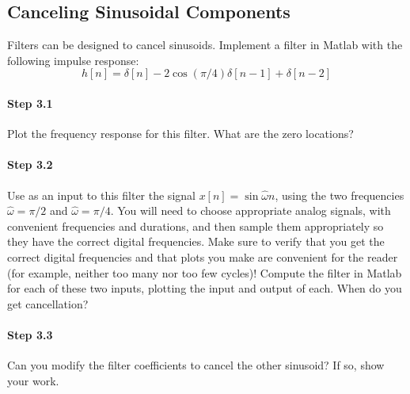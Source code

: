 \subsection{Canceling Sinusoidal Components}

Filters can be designed to cancel sinusoids.  Implement a filter in
Matlab with the following impulse response:
\begin{equation}
h[n] = \delta[n] - 2\cos(\pi/4) \delta[n-1] + \delta[n-2]
\end{equation}

\paragraph{Step 3.1} Plot the frequency response for this filter. What
	are the zero locations?


\paragraph{Step 3.2} Use as an input to this filter the signal
        $x[n] = \sin\hat{\omega}n$, using the two frequencies
        $\hat{\omega} = \pi/2$ and $\hat{\omega} = \pi/4$. You will
        need to choose appropriate analog signals, with convenient
        frequencies and durations, and then sample them appropriately
        so they have the correct digital frequencies. Make sure to
        verify that you get the correct digital frequencies and that
        plots you make are convenient for the reader (for example,
        neither too many nor too few cycles)! Compute the filter in
        Matlab for each of these two inputs, plotting the input and
        output of each. When do you get cancellation?

\paragraph{Step 3.3} Can you modify the filter coefficients to cancel
	the other sinusoid? If so, show your work.




